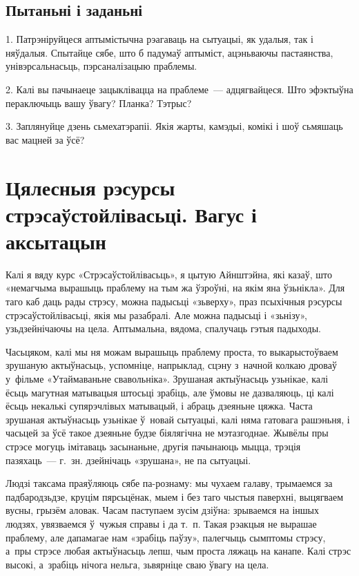 \subsection*{Пытаньні і заданьні}

1. Патрэніруйцеся аптымістычна рэагаваць на сытуацыі, як удалыя, так і няўдалыя. Спытайце сябе, што б падумаў аптыміст, ацэньваючы пастаянства, унівэрсальнасьць, пэрсаналізацыю праблемы.

2. Калі вы пачынаеце зацыклівацца на праблеме~--- адцягвайцеся. Што эфэктыўна пераключыць вашу ўвагу? Планка? Тэтрыс?

3. Заплянуйце дзень сьмехатэрапіі. Якія жарты, камэдыі, комікі і шоў сьмяшаць вас мацней за ўсё?


\section{Цялесныя рэсурсы стрэсаўстойлівасьці. Вагус і аксытацын}

Калі я вяду курс «Стрэсаўстойлівасьць», я цытую Айнштэйна, які казаў, што «немагчыма вырашыць праблему на тым жа ўзроўні, на якім яна ўзьнікла». Для таго каб даць рады стрэсу, можна падысьці «зьверху», праз псыхічныя рэсурсы стрэсаўстойлівасьці, якія мы разабралі. Але можна падысьці і «зьнізу», узьдзейнічаючы на цела. Аптымальна, вядома, спалучаць гэтыя падыходы.

Часьцяком, калі мы ня можам вырашыць праблему проста, то выкарыстоўваем зрушаную актыўнасьць, успомніце, напрыклад, сцэну з~начной колкаю дроваў у~фільме «Утаймаваньне свавольніка». Зрушаная актыўнасьць узьнікае, калі ёсьць магутная матывацыя штосьці зрабіць, але ўмовы не дазваляюць, ці калі ёсьць некалькі супярэчлівых матывацый, і абраць дзеяньне цяжка. Часта зрушаная актыўнасьць узьнікае ў~новай сытуацыі, калі няма гатовага рашэньня, і часьцей за ўсё такое дзеяньне будзе біялягічна не мэтазгоднае. Жывёлы пры стрэсе могуць імітаваць засынаньне, другія пачынаюць мыцца, трэція пазяхаць~--- г.~зн. дзейнічаць «зрушана», не па сытуацыі.

Людзі таксама праяўляюць сябе па-рознаму: мы чухаем галаву, трымаемся за падбародзьдзе, круцім пярсьцёнак, мыем і без таго чыстыя паверхні, выцягваем вусны, грызём аловак. Часам паступаем зусім дзіўна: зрываемся на іншых людзях, увязваемся ў~чужыя справы і да т.~п. Такая рэакцыя не вырашае праблему, але дапамагае нам «зрабіць паўзу», палегчыць сымптомы стрэсу, а~пры стрэсе любая актыўнасьць лепш, чым проста ляжаць на канапе. Калі стрэс высокі, а~зрабіць нічога нельга, зьвярніце сваю ўвагу на цела.

